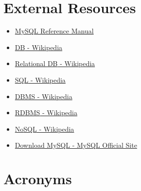 
\newpage
\section{External Resources}
\begin{itemize}
	\item \href{https://dev.mysql.com/doc/refman/8.0/en/}{MySQL Reference Manual}
	\item\href{https://en.wikipedia.org/wiki/Database}{\acl{DB} - Wikipedia}
	\item\href{https://en.wikipedia.org/wiki/Relational_database}{Relational \acl{DB} - Wikipedia}
	\item\href{https://en.wikipedia.org/wiki/SQL}{\acs{SQL} - Wikipedia}
	\item\href{https://en.wikipedia.org/wiki/Database#Database_management_system}{\acs{DBMS} - Wikipedia}
	\item\href{https://en.wikipedia.org/wiki/Relational_database#RDBMS}{\acs{RDBMS} - Wikipedia}
	\item\href{https://en.wikipedia.org/wiki/NoSQL}{No\acs{SQL} - Wikipedia}
	\item\href{https://dev.mysql.com/downloads/installer/}{Download My\acs{SQL} - MySQL Official Site}
\end{itemize}


\section{Acronyms}
\begin{acronym}
\end{acronym}
